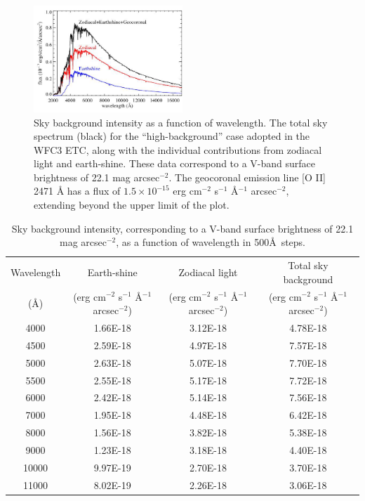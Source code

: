 \documentclass[11pt]{article}      %
\begin{document}
\begin{figure}[hbtp]
  \begin{center}
    \includegraphics[width=0.5\textwidth]{zodiacal_vs_wavelength.png}
    \caption{Sky background intensity as a function of wavelength. The total sky spectrum (black) for the “high-background” case adopted in the WFC3 ETC, along with the individual contributions from zodiacal light and earth-shine. These data correspond to a V-band surface brightness of 22.1 mag arcsec$^{−2}$. The geocoronal emission line [O II] 2471 Å has a flux of $1.5\times10^{−15}$ erg cm$^{-2}$ s$^{-1}$ \AA$^{-1}$ arcsec$^{-2}$, extending beyond the upper limit of the plot.}
    \label{fig:zodiacal_vs_wavelength}
  \end{center}
\end{figure}

\begin{table}[hb]
  \begin{center}
  \caption{Sky background intensity, corresponding to a V-band surface brightness of 22.1 mag arcsec$^{−2}$, as a function of wavelength in 500\AA\ steps.}
  \begin{tabular}{|c|c|c|c|}
\hline
Wavelength & Earth-shine & Zodiacal light & Total sky background \\
(\AA) & (erg cm$^{-2}$ s$^{-1}$ \AA$^{-1}$ arcsec$^{-2}$) & (erg cm$^{-2}$ s$^{-1}$ \AA$^{-1}$ arcsec$^{-2}$) &(erg cm$^{-2}$ s$^{-1}$ \AA$^{-1}$ arcsec$^{-2}$) \\
\hline
4000 & 1.66E-18 & 3.12E-18 & 4.78E-18 \\
4500 & 2.59E-18 & 4.97E-18 & 7.57E-18 \\
5000 & 2.63E-18 & 5.07E-18 & 7.70E-18 \\
5500 & 2.55E-18 & 5.17E-18 & 7.72E-18 \\
6000 & 2.42E-18 & 5.14E-18 & 7.56E-18 \\
7000 & 1.95E-18 & 4.48E-18 & 6.42E-18 \\
8000 & 1.56E-18 & 3.82E-18 & 5.38E-18 \\
9000 & 1.23E-18 & 3.18E-18 & 4.40E-18 \\
10000 & 9.97E-19 & 2.70E-18 & 3.70E-18 \\
11000 & 8.02E-19 & 2.26E-18 & 3.06E-18 \\
\hline
  \end{tabular}
  \label{tab:zodiacal_vs_wavelength}
\end{center}
\end{table}
\end{document}
